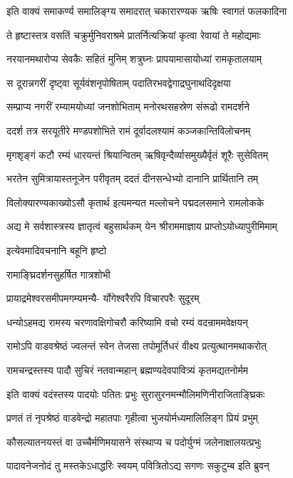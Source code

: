 \twolineshloka
{इति वाक्यं समाकर्ण्य समालिङ्ग्य समादरात्}
{चकारारण्यक ऋषिः स्वागतं फलकादिना}%

\twolineshloka
{ते हृष्टास्तत्र वसतिं चक्रुर्मुनिवराश्रमे}
{प्रातर्नित्यक्रियां कृत्वा रेवायां ते महोद्यमाः}%

\twolineshloka
{नरयानमथारोप्य सेवकैः सहितं मुनिम्}
{शत्रुघ्नः प्रापयामासायोध्यां रामकृतालयाम्}%

\twolineshloka
{स दूरान्नगरीं दृष्ट्वा सूर्यवंशनृपोषिताम्}
{पदातिरभवद्वेगाद्रघुनाथदिदृक्षया}%

\twolineshloka
{सम्प्राप्य नगरीं रम्यामयोध्यां जनशोभिताम्}
{मनोरथसहस्रेण संरूढो रामदर्शने}%

\twolineshloka
{ददर्श तत्र सरयूतीरे मण्डपशोभिते}
{रामं दूर्वादलश्यामं कञ्जकान्तिविलोचनम्}%

\twolineshloka
{मृगशृङ्गं कटौ रम्यं धारयन्तं श्रियान्वितम्}
{ऋषिवृन्दैर्व्यासमुख्यैर्वृतं शूरैः सुसेवितम्}%

\twolineshloka
{भरतेन सुमित्रायास्तनूजेन परीवृतम्}
{ददतं दीनसन्धेभ्यो दानानि प्रार्थितानि तम्}%

\twolineshloka
{विलोक्यारण्यकाख्योऽसौ कृतार्थ इत्यमन्यत}
{मल्लोचने पद्मदलसमाने रामलोकके}%

\twolineshloka
{अद्य मे सर्वशास्त्रस्य ज्ञातृत्वं बहुसार्थकम्}
{येन श्रीराममाज्ञाय प्राप्तोऽयोध्यापुरीमिमाम्}%

इत्येवमादिवचनानि बहूनि हृष्टो

रामाङ्घ्रिदर्शनसुहर्षित गात्रशोभी

\twolineshloka
{प्रायाद्रमेश्वरसमीपमगम्यमन्यै-}
{र्योगेश्वरैरपि विचारपरैः सुदूरम्}%

\twolineshloka
{धन्योऽहमद्य रामस्य चरणावक्षिगोचरौ}
{करिष्यामि वचो रम्यं वदन्राममवेक्षयन्}%

\twolineshloka
{रामोऽपि वाडवश्रेष्ठं ज्वलन्तं स्वेन तेजसा}
{तपोमूर्तिधरं वीक्ष्य प्रत्युत्थानमथाकरोत्}%

\twolineshloka
{रामचन्द्रस्तस्य पादौ सुचिरं नतवान्महान्}
{ब्रह्मण्यदेवपावित्र्यं कृतमद्यतनोर्मम}%

\twolineshloka
{इति वाक्यं वदंस्तस्य पादयोः पतितः प्रभुः}
{सुरासुरनमन्मौलिमणिनीराजिताङ्घ्रिकः}%

\twolineshloka
{प्रणतं तं नृपश्रेष्ठं वाडवेन्द्रो महातपाः}
{गृहीत्वा भुजयोर्मध्यमालिलिङ्ग प्रियं प्रभुम्}%

\twolineshloka
{कौसल्यातनयस्तं वा उच्चैर्मणिमयासने}
{संस्थाप्य च पदोर्युग्मं जलेनाक्षालयत्प्रभुः}%

\twolineshloka
{पादावनेजनोदं तु मस्तकेऽधाद्धरिः स्वयम्}
{पवित्रितोऽद्य सगणः सकुटुम्ब इति ब्रुवन्}%


